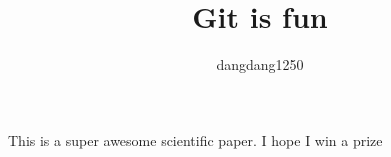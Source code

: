 \documentclass[10pt]{article}
\author{dangdang1250}
\title{Git is fun}
\begin{document}
	\maketitle
	
	This is a super awesome scientific paper.
	I hope I win a prize
\end{document}
